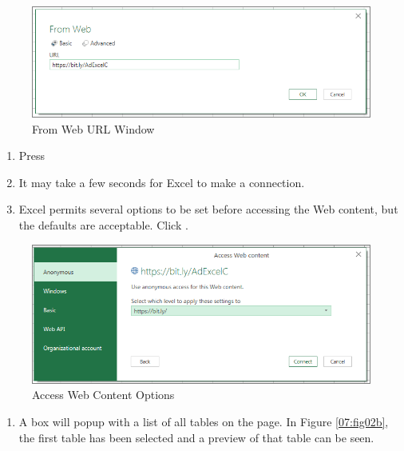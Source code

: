 \begin{figure}[H]
	\centering
	\includegraphics[width=\maxwidth{.95\linewidth}]{gfx/ch07_fig02a}
	\caption{From Web URL Window}
	\label{07:fig02a}
\end{figure}
	
\begin{enumerate}[resume]
	\item Press 
	\item It may take a few seconds for Excel to make a connection.
	\item Excel permits several options to be set before accessing the Web content, but the defaults are acceptable. Click .
\end{enumerate}

\begin{figure}[H]
	\centering
	\includegraphics[width=\maxwidth{.95\linewidth}]{gfx/ch07_fig02g}
	\caption{Access Web Content Options}
	\label{07:fig02g}
\end{figure}
	
\begin{enumerate}[resume]
	\item A box will popup with a list of all tables on the page. In Figure \ref{07:fig02b}, the first table has been selected and a preview of that table can be seen.
\end{enumerate}

